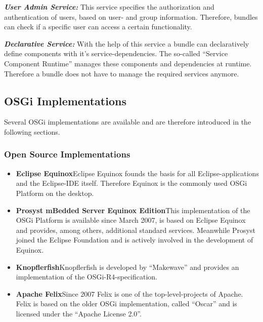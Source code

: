 \noindent\textbf{\textit{User Admin Service:}} This service specifies the
authorization and authentication of users, based on user- and group information.
Therefore, bundles can check if a specific user can access a certain
functionality.

\noindent\textbf{\textit{Declarative Service:}} With the help of this service a
bundle can declaratively define components with it's service-dependencies. The
so-called ``Service Component Runtime'' manages these components and dependencies
at runtime. Therefore a bundle does not have to manage the required services
anymore.

\subsection{OSGi Implementations}
\label{sec:osgi_implementations}

Several OSGi implementations are available and are therefore introduced in the following sections.

\subsubsection{Open Source Implementations}

\begin{itemize}
	\item\textbf{Eclipse Equinox}\newline Eclipse Equinox founds the basis for all Eclipse-applications
	and the Eclipse-IDE itself. Therefore Equinox is the commonly used OSGi Platform on the desktop.
	\item\textbf{Prosyst mBedded Server Equinox Edition}\newline This implementation of the OSGi
	Platform is available since March 2007, is based on Eclipse Equinox and provides, among others,
	additional standard services. Meanwhile Prosyst joined the Eclipse Foundation and is actively
	involved in the development of Equinox.
	\item\textbf{Knopflerfish}\newline Knopflerfish is developed by ``Makewave'' and provides an
	implementation of the OSGi-R4-specification.
	\item\textbf{Apache Felix}\newline Since 2007 Felix is one of the top-level-projects of Apache.
	Felix is based on the older OSGi implementation, called ``Oscar'' and is licensed under the
	``Apache License 2.0''.
\end{itemize}

